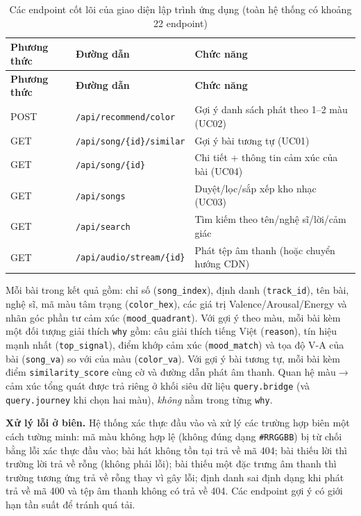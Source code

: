 \documentclass[../DoAn.tex]{subfiles}
\begin{document}
\begin{longtable}{|p{1.8cm}|p{5.8cm}|p{6.0cm}|}
\caption{Các endpoint cốt lõi của giao diện lập trình ứng dụng (toàn hệ thống có khoảng 22 endpoint)}\label{table:api}\\
\hline
\textbf{Phương thức} & \textbf{Đường dẫn} & \textbf{Chức năng} \\
\hline
\endfirsthead
\hline
\textbf{Phương thức} & \textbf{Đường dẫn} & \textbf{Chức năng} \\
\hline
\endhead
POST & \texttt{/api/recommend/color} & Gợi ý danh sách phát theo 1--2 màu (UC02) \\
\hline
GET & \texttt{/api/song/\{id\}/similar} & Gợi ý bài tương tự (UC01) \\
\hline
GET & \texttt{/api/song/\{id\}} & Chi tiết + thông tin cảm xúc của bài (UC04) \\
\hline
GET & \texttt{/api/songs} & Duyệt/lọc/sắp xếp kho nhạc (UC03) \\
\hline
GET & \texttt{/api/search} & Tìm kiếm theo tên/nghệ sĩ/lời/cảm giác \\
\hline
GET & \texttt{/api/audio/stream/\{id\}} & Phát tệp âm thanh (hoặc chuyển hướng CDN) \\
\hline
\end{longtable}

Mỗi bài trong kết quả gồm: chỉ số (\texttt{song\_index}), định danh (\texttt{track\_id}), tên bài, nghệ sĩ, mã màu tâm trạng (\texttt{color\_hex}), các giá trị Valence/Arousal/Energy và nhãn góc phần tư cảm xúc (\texttt{mood\_quadrant}). Với gợi ý theo màu, mỗi bài kèm một đối tượng giải thích \texttt{why} gồm: câu giải thích tiếng Việt (\texttt{reason}), tín hiệu mạnh nhất (\texttt{top\_signal}), điểm khớp cảm xúc (\texttt{mood\_match}) và tọa độ V-A của bài (\texttt{song\_va}) so với của màu (\texttt{color\_va}). Với gợi ý bài tương tự, mỗi bài kèm điểm \texttt{similarity\_score} cùng cờ và đường dẫn phát âm thanh. Quan hệ màu$\rightarrow$cảm xúc tổng quát được trả riêng ở khối siêu dữ liệu \texttt{query.bridge} (và \texttt{query.journey} khi chọn hai màu), \textit{không} nằm trong từng \texttt{why}.

\textbf{Xử lý lỗi ở biên.} Hệ thống xác thực đầu vào và xử lý các trường hợp biên một cách tường minh: mã màu không hợp lệ (không đúng dạng \texttt{\#RRGGBB}) bị từ chối bằng lỗi xác thực đầu vào; bài hát không tồn tại trả về mã 404; bài thiếu lời thì trường lời trả về rỗng (không phải lỗi); bài thiếu một đặc trưng âm thanh thì trường tương ứng trả về rỗng thay vì gây lỗi; định danh sai định dạng khi phát trả về mã 400 và tệp âm thanh không có trả về 404. Các endpoint gợi ý có giới hạn tần suất để tránh quá tải.
\end{document}
